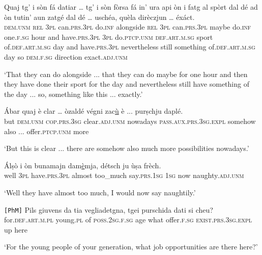 \begin{linenumbers}
	\gll Quaj tg’ i sòn fá datiar … tg’ i sòn fòrsa fá in’ ura api òn i fatg al spòrt dal dé ad òn tutin’ aun zatgé dal dé … uschéa, quèla dirèczjun … éxáct.\\
	\textsc{dem.unm} \textsc{rel} \textsc{3pl} can.\textsc{prs.3pl} do.\textsc{inf} alongside {} \textsc{rel} \textsc{3pl} can.\textsc{prs.3pl} maybe do.\textsc{inf} one.\textsc{f.sg} hour and have.\textsc{prs.3pl} \textsc{3pl} do.\textsc{ptcp.unm} \textsc{def.art.m.sg} sport of.\textsc{def.art.m.sg} day and have.\textsc{prs.3pl} nevertheless still something of.\textsc{def.art.m.sg} day {} so \textsc{dem.f.sg} direction {} exact.\textsc{adj.unm}\\
\end{linenumbers}
\medskip
\glt `That they can do alongside ... that they can do maybe for one hour and then they have done their sport for the day and nevertheless still have something of the day ... so, something like this ... exactly.'
\medskip

\begin{linenumbers}
	\gll Ábar quaj è clar … òzaldé végni zac\underline{ù} è ...  purṣchju daplé.   \\
	but \textsc{dem.unm} \textsc{cop.prs.3sg} clear.\textsc{adj.unm} {} nowadays \textsc{pass.aux.prs.3sg.expl} somehow also ... offer.\textsc{ptcp.unm} more\\
\end{linenumbers}
\medskip
\glt `But this is clear ... there are somehow also much more possibilities nowadays.'
\medskip

\begin{linenumbers}
	\gll  Álṣò i òn bunamajn dam\underline{è}mja, détsch ju ùṣa frèch.\footnotemark{}  \\
	well \textsc{3pl} have.\textsc{prs.3pl} almost too\_much say.\textsc{prs.1sg} \textsc{1sg} now naughty.\textsc{adj.unm}\\
\end{linenumbers}
\medskip
\glt `Well they have almost too much, I would now say naughtily.'
\medskip

\begin{linenumbers}
	\gll  \texttt{[PhM]} Pils giuvens da tia vegliadetgna, tgei purschida dati si cheu?  \\
	{} for.\textsc{def.art.m.pl} young.\textsc{pl} of \textsc{poss.2sg.f.sg} age what offer.\textsc{f.sg} \textsc{exist.prs.3sg.expl} up here\\
\end{linenumbers}
\medskip
\glt `For the young people of your generation, what job opportunities are there here?'
\medskip

